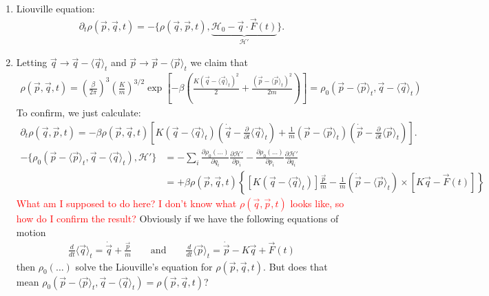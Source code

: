 \documentclass{article}
\theoremstyle{definition}
\newcommand{\p}{\partial}
\newcommand{\ham}{\mathcal{H}}
\newcommand{\be}{\beta}
\newcommand{\f}[2]{\frac{#1}{#2}}
\newcommand{\lp}{\left(}
\newcommand{\rp}{\right)}
\newcommand{\lb}{\left[}
\newcommand{\rb}{\right]}
\newcommand{\lc}{\left\{}
\newcommand{\rc}{\right\}}
\begin{document}
\begin{enumerate}[label=(\alph*)]
	\item Liouville equation:
	\begin{align*}
	\p_t \rho(\vec{p},\vec{q}, t) = -\{\rho(\vec{q},\vec{p},t), \underbrace{\ham_0 - \vec{q}\cdot \vec{F}(t)}_{\ham'}\}.
	\end{align*}
	
	
	\item Letting $\vec{q} \to \vec{q} - \langle \vec{q} \rangle_t$ and $\vec{p} \to \vec{p} - \langle \vec{p}\rangle_t$ we claim that
	\begin{align*}
	\rho(\vec{p}, \vec{q},t) = {\lp \f{\be}{2\pi} \rp^3 \lp \f{K}{m} \rp^{3/2}} \exp\lb -\be\lp \f{K(\vec{q} - \langle \vec{q} \rangle_t)^2}{2} + \f{(\vec{p} - \langle \vec{p}\rangle_t)^2}{2m} \rp \rb = \rho_0(\vec{p} - \langle \vec{p}\rangle_t , \vec{q} - \langle \vec{q}\rangle_t)
	\end{align*}
	To confirm, we just calculate:
	\begin{align*}
	\p_t \rho(\vec{q},\vec{p},t) = -\be \rho(\vec{p},\vec{q},t) \lb K(\vec{q} - \langle \vec{q} \rangle_t )\lp \dot{\vec{q}} - \f{\p}{\p t} \langle \vec{q}\rangle_t\rp + \f{1}{m}(\vec{p} - \langle \vec{p} \rangle_t)\lp \dot{\vec{p}} - \f{\p}{\p t} \langle \vec{p} \rangle_t \rp \rb.
	\end{align*}
	\begin{align*}
	-\{\rho_0(\vec{p} - \langle \vec{p}\rangle_t , \vec{q} - \langle \vec{q}\rangle_t), \ham' \}
	&= -\sum_i \f{\p \rho_0(\dots)}{\p q_i}\f{\p \ham'}{\p p_i} - \f{\p \rho_0(\dots)}{\p p_i}\f{\p \ham'}{\p q_i}\\
	&= +\be \rho(\vec{p},\vec{q},t)\lc  \lb K(\vec{q} - \langle \vec{q}\rangle_t) \rb \f{\vec{p}}{m} -\f{1}{m}(\dot{\vec{p}} -  \langle \vec{p}\rangle_t)  \times \lb K\vec{q} -\vec{F}(t) \rb \rc
	\end{align*}
	\textcolor{red}{What am I supposed to do here? I don't know what $\rho(\vec{q},\vec{p},t)$ looks like, so how do I confirm the result?} Obviously if we have the following equations of motion
	\begin{align*}
	\boxed{\f{d}{dt}\langle \vec{q} \rangle_t = \dot{\vec{q}} + \f{\vec{p}}{m}} \quad\quad \text{and} \quad\quad \boxed{\f{d}{dt}\langle \vec{p} \rangle_t = \dot{\vec{p}} - K\vec{q} + \vec{F}(t)}
	\end{align*}
	then $\rho_0(\dots)$ solve the Liouville's equation for $\rho(\vec{p},\vec{q},t)$. But does that mean $\rho_0(\vec{p} - \langle \vec{p}\rangle_t, \vec{q} - \langle \vec{q} \rangle_t) = \rho(\vec{p},\vec{q},t)$?
	

\end{enumerate}
\end{document}
